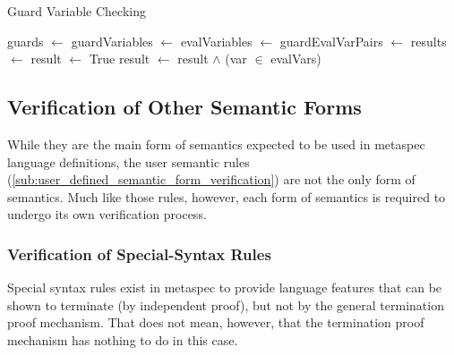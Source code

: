 \begin{breakablealgorithm}
\caption{Guard Variable Checking}
\label{alg:guard_variable_checking}
\begin{algorithmic}
    \State guards $\gets$ 
    \State guardVariables $\gets$ 
    \State evalVariables $\gets$ 
    \State guardEvalVarPairs $\gets$ 
    \State results $\gets$ 
    \State {}
\EndFunction
\State
{}
    \State result $\gets$ True
        \State result $\gets$ result $\land$ (var $\in$ evalVars)
    \EndFor
        \State {}
    \Else
        \State {}
    \EndIf
\EndFunction
\end{algorithmic}
\end{breakablealgorithm}



\subsection{Verification of Other Semantic Forms} %
\label{sub:verification_of_other_semantic_forms}
While they are the main form of semantics expected to be used in \gls{metaspec} language definitions, the user semantic rules (\autoref{sub:user_defined_semantic_form_verification}) are not the only form of semantics.
Much like those rules, however, each form of semantics is required to undergo its own verification process. 

\subsubsection{Verification of Special-Syntax Rules} %
\label{ssub:verification_of_special_syntax_rules}
Special syntax rules exist in \gls{metaspec} to provide language features that can be shown to terminate (by independent proof), but not by the general termination proof mechanism. 
That does not mean, however, that the termination proof mechanism has nothing to do in this case.\\

